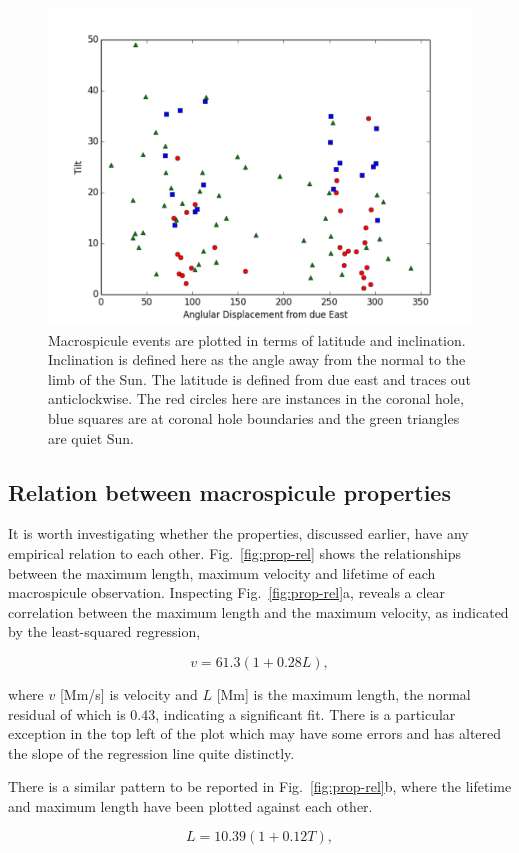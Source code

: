 \begin{figure}[t!]
	\centering
	\includegraphics[width=0.5\columnwidth]{Chapter3/Figs/tilt_vs_lat.pdf}	
	\caption{\small Macrospicule events are plotted in terms of latitude and inclination. Inclination is defined here as the angle away from the normal to the limb of the Sun. The latitude is defined from due east and traces out anticlockwise. The red circles here are instances in the coronal hole, blue squares are at coronal hole boundaries and the green triangles are quiet Sun.}
	\label{fig:tilt-lat}
\end{figure}


\subsection{Relation between macrospicule properties}
It is worth investigating whether the properties, discussed earlier, have any empirical relation to each other. Fig.~\ref{fig:prop-rel} shows the relationships between the maximum length, maximum velocity and lifetime of each macrospicule observation. Inspecting Fig.~\ref{fig:prop-rel}a, reveals a clear correlation between the maximum length and the maximum velocity, as indicated by the least-squared regression, 

\begin{equation}
v = 61.3(1 + 0.28L),
\end{equation}

\noindent where $v$ [Mm/s] is velocity and $L$ [Mm] is the maximum length, the normal residual of which is $0.43$, indicating a significant fit. There is a particular exception in the top left of the plot which may have some errors and has altered the slope of the regression line quite distinctly.

There is a similar pattern to be reported in Fig.~\ref{fig:prop-rel}b, where the lifetime and maximum length have been plotted against each other.

\begin{equation}
L = 10.39(1 + 0.12T),
\end{equation}

